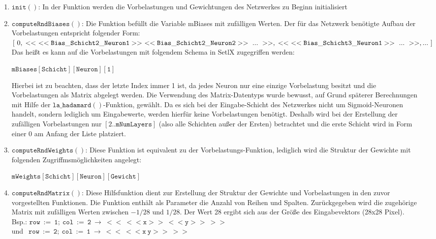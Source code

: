 \begin{enumerate}
\item $\mathtt{init()}$: In der Funktion werden die Vorbelastungen und Gewichtungen des Netzwerkes zu Beginn initialisiert
\item $\mathtt{computeRndBiases()}$: Die Funktion befüllt die Variable mBiases mit zufälligen Werten. Der für das Netzwerk benötigte Aufbau der Vorbelastungen entspricht folgender Form: \\
$[\ 0,\\ 
<<\ <<\mathtt{Bias\_Schicht2\_Neuron1}>>\ <<\mathtt{Bias\_Schicht2\_Neuron2}>>\ ...\ >>, \\
<<\ <<\mathtt{Bias\_Schicht3\_Neuron1}>>\ ...\ >>, \\
 ...\ ]$ \\
Das heißt es kann auf die Vorbelastungen mit folgendem Schema in SetlX zugegriffen werden: \\
\begin{center}
	$\mathtt{mBiases[Schicht][Neuron][1]}$
\end{center}
Hierbei ist zu beachten, dass der letzte Index immer 1 ist, da jedes Neuron nur eine einzige Vorbelastung besitzt und die Vorbelastungen als Matrix abgelegt werden. Die Verwendung des Matrix-Datentyps wurde bewusst, auf Grund späterer Berechnungen mit Hilfe der $\mathtt{la\_hadamard()}$-Funktion, gewählt. Da es sich bei der Eingabe-Schicht des Netzwerkes nicht um Sigmoid-Neuronen handelt, sondern lediglich um Eingabewerte, werden hierfür keine Vorbelastungen benötigt. Deshalb wird bei der Erstellung der zufälligen Vorbelastungen nur $[2..\mathtt{mNumLayers}]$ (also alle Schichten außer der Ersten) betrachtet und die erste Schicht wird in Form einer 0 am Anfang der Liste platziert.
\item $\mathtt{computeRndWeights()}$: Diese Funktion ist equivalent zu der Vorbelastungs-Funktion, lediglich wird die Struktur der Gewichte mit folgenden Zugriffmsmöglichkeiten angelegt: \\
\begin{center}
	$\mathtt{mWeights[Schicht][Neuron][Gewicht]}$
\end{center}
\item $\mathtt{computeRndMatrix()}$: Diese Hilfsfunktion dient zur Erstellung der Struktur der Gewichte und Vorbelastungen in den zuvor vorgestellten Funktionen. Die Funktion enthält als Parameter die Anzahl von Reihen und Spalten. Zurückgegeben wird die zugehörige Matrix mit zufälligen Werten zwischen $-1/28$ und $1/28$. Der Wert 28 ergibt sich aus der Größe des Eingabevektors (28x28 Pixel). \\
Bsp.: $\mathtt{row\ :=\ 1;\ col\ :=\ 2\ \rightarrow\ <<\ <<x>>\ <<y>>\ >>}$ \\ 
und $\ \ \mathtt{row\ :=\ 2;\ col\ :=\ 1\ \rightarrow\ <<\ <<x\ y>>\ >>}$
\end{enumerate}

